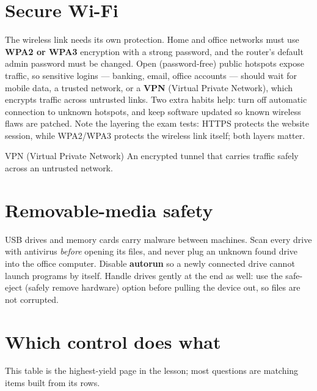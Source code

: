 \section{Secure Wi-Fi}
The wireless link needs its own protection. Home and office networks must use
\textbf{WPA2 or WPA3} encryption with a strong password, and the router's
default admin password must be changed. Open (password-free) public hotspots
expose traffic, so sensitive logins --- banking, email, office accounts ---
should wait for mobile data, a trusted network, or a \textbf{VPN} (Virtual
Private Network), which encrypts traffic across untrusted links. Two extra
habits help: turn off automatic connection to unknown hotspots, and keep
software updated so known wireless flaws are patched. Note the layering the
exam tests: HTTPS protects the website session, while WPA2/WPA3 protects the
wireless link itself; both layers matter.

\begin{definitionbox}{VPN (Virtual Private Network)}
An encrypted tunnel that carries traffic safely across an untrusted network.
\end{definitionbox}

\section{Removable-media safety}
USB drives and memory cards carry malware between machines. Scan every drive
with antivirus \emph{before} opening its files, and never plug an unknown
found drive into the office computer. Disable \textbf{autorun} so a
newly connected drive cannot launch programs by itself. Handle drives gently
at the end as well: use the safe-eject (safely remove hardware) option before
pulling the device out, so files are not corrupted.

\section{Which control does what}
This table is the highest-yield page in the lesson; most questions are
matching items built from its rows.

